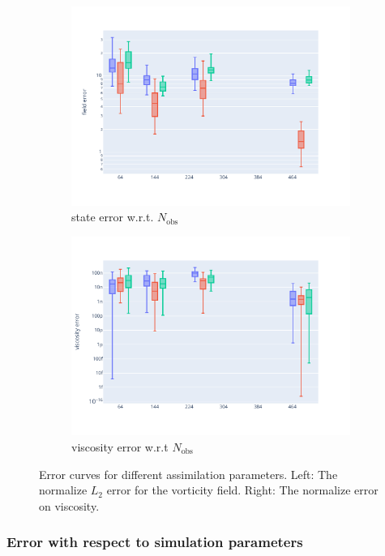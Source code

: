 \begin{figure}[htbp]
\begin{subfigure}{0.48\textwidth}
		\includegraphics[width=\linewidth]{./images/app2d/MSE_nobs_box.pdf}
		\caption{state error w.r.t. $N_{\text{obs}}$}
	\end{subfigure}
	\hfill
	\begin{subfigure}{0.45\textwidth}
		\captionsetup{labelformat=empty}
		\centering
		\includegraphics[width=\linewidth]{./images/app2d/MSE_visc_nobs_box.pdf}
		\caption{viscosity error w.r.t $N_{\text{obs}}$}
		\label{fig:nobs}
	\end{subfigure}
	\caption{Error curves for different assimilation parameters. Left: The normalize $L_2$ error for the vorticity field. Right: The normalize error on viscosity.}
	\label{fig:assim_params}
\end{figure}

\subsubsection{Error with respect to simulation parameters}

